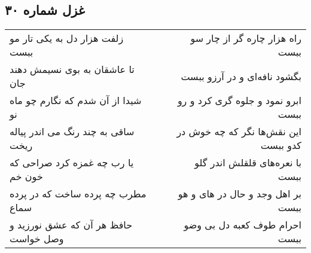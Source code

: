 \begin{center}
\section*{غزل شماره ۳۰}
\label{sec:sh030}
\begin{longtable}{l p{0.5cm} r}
زلفت هزار دل به یکی تار مو ببست
&&
راه هزار چاره گر از چار سو ببست
\\
تا عاشقان به بوی نسیمش دهند جان
&&
بگشود نافه‌ای و در آرزو ببست
\\
شیدا از آن شدم که نگارم چو ماه نو
&&
ابرو نمود و جلوه گری کرد و رو ببست
\\
ساقی به چند رنگ می اندر پیاله ریخت
&&
این نقش‌ها نگر که چه خوش در کدو ببست
\\
یا رب چه غمزه کرد صراحی که خون خم
&&
با نعره‌های قلقلش اندر گلو ببست
\\
مطرب چه پرده ساخت که در پرده سماع
&&
بر اهل وجد و حال در های و هو ببست
\\
حافظ هر آن که عشق نورزید و وصل خواست
&&
احرام طوف کعبه دل بی وضو ببست
\\
\end{longtable}
\end{center}

